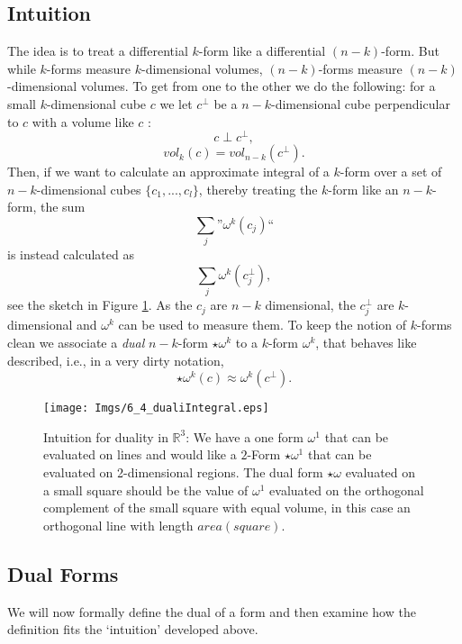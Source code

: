 \subsection{Intuition}
\label{subsec:hodgeintuition}
The idea is to treat a differential $k$-form like a differential $(n-k)$-form. But while $k$-forms measure $k$-dimensional volumes, $(n-k)$-forms measure $(n-k)$-dimensional volumes.
To get from one to the other we do the following: for a small $k$-dimensional cube $c$ we let $c^\perp$ be a $n-k$-dimensional cube perpendicular to $c$ with a volume like $c$ :
\[c\perp c^\perp, \]
\[vol_k(c) = vol_{n-k}(c^\perp).\] 
Then, if we want to calculate an approximate integral of a $k$-form over a set of $n-k$-dimensional cubes $\{c_1,...,c_l\}$, thereby treating the $k$-form like an $n-k$-form, the sum
\[\sum_{j} \text{''}\omega^k(c_j)\text{``}\]
is instead calculated as 
\[\sum_{j} \omega^k(c_j^{\perp}),\]
see the sketch in Figure \ref{fig::6_1_dualIntegral}. As the $c_j$ are $n-k$ dimensional, the $c_j^\perp$ are $k$-dimensional and $\omega^k$ can be used to measure them. To keep the notion of $k$-forms clean we associate a \emph{dual} $n-k$-form $\star\omega^k$ to a $k$-form $\omega^k$, that behaves like described, i.e., in a very dirty notation,
\[\star\omega^k(c) \approx  \omega^k(c^\perp).\]
\begin{figure}[t]
\begin{center}
\texttt{[image: Imgs/6\_4\_dualiIntegral.eps]}
\end{center}
\caption{Intuition for duality in $\mathbb R^3$: We have a one form $\omega^1$ that can be evaluated on lines and would like a $2$-Form $\star \omega^1$ that can be evaluated on 2-dimensional regions. The dual form $\star \omega$ evaluated on a small square should be the value of $\omega^1$ evaluated on the orthogonal complement of the small square with equal volume, in this case an orthogonal line with length $area(square)$. }
\label{fig::6_1_dualIntegral}
\end{figure}

\subsection{Dual Forms}
We will now formally define the dual of a form and then examine how the definition fits the `intuition' developed above. 

